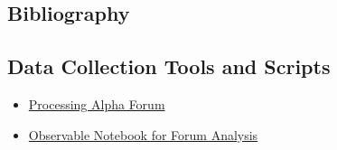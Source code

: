 \documentclass[draft]{article}
\begin{document}
\subsection{Bibliography}
\newpage


\subsection{Data Collection Tools and Scripts}

\begin{itemize}
    \item \href{https://forum.processing.org/alpha/}{Processing Alpha Forum}
    \item \href{https://observablehq.com/d/042b1cf42ea9bb5e}{Observable Notebook for Forum Analysis}
\end{itemize}


\end{document}
